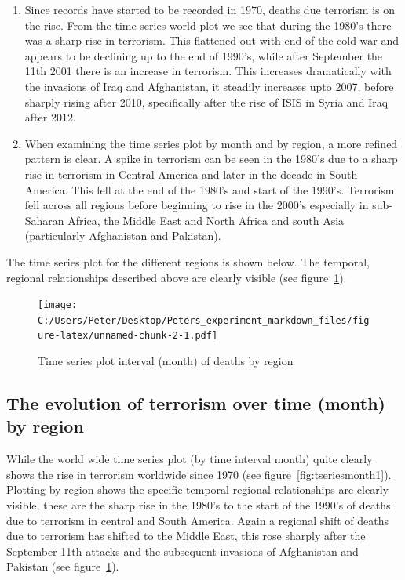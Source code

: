\begin{enumerate}
\item
  Since records have started to be recorded in 1970, deaths due  terrorism is on the rise. From the time series world plot we see that during the 1980's there was a sharp rise in terrorism. This flattened out with end of the cold war and appears to be declining up to the end of 1990's, while after September the 11th 2001 there is an increase in  terrorism. This increases dramatically with the invasions of Iraq and  Afghanistan, it steadily increases upto 2007, before sharply rising after 2010, specifically after the rise of ISIS in Syria and Iraq after 2012.
\item
  When examining the time series plot by month and by region, a more  refined pattern is clear. A spike in terrorism can be seen in the 1980's due to a sharp rise in terrorism in Central America and later in the decade in South America. This fell at the end of the 1980's and start of the 1990's. Terrorism fell across all regions before beginning to rise in the 2000's especially in sub-Saharan Africa, the Middle East and North Africa and south Asia (particularly Afghanistan and Pakistan).
\end{enumerate}
The time series plot for the different regions is shown below. The
temporal, regional relationships described above are clearly visible (see figure~\ref{fig:tseriesmonthregion1}).

\begin{figure}[t]
\texttt{[image: C:/Users/Peter/Desktop/Peters\_experiment\_markdown\_files/figure-latex/unnamed-chunk-2-1.pdf]}
\caption{Time series plot interval (month) of deaths by region}
\label{fig:tseriesmonthregion1}
\centering
\end{figure}

\subsection{The evolution of terrorism over time (month) by
region}

While the world wide time series plot (by time interval month) quite clearly shows the rise in terrorism worldwide since 1970 (see figure~\ref{fig:tseriesmonth1}). Plotting by region shows the specific temporal regional relationships are clearly visible, these are the sharp rise in the 1980's to the start of the 1990's of deaths due to terrorism in central and South America. Again a regional shift of deaths due to terrorism has shifted to the Middle East, this rose sharply after the September 11th attacks and the subsequent invasions of Afghanistan and Pakistan (see figure~\ref{fig:tseriesmonthregion1}).

